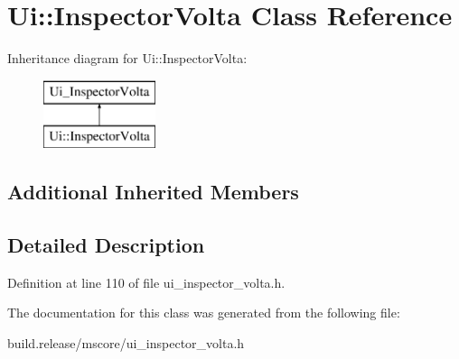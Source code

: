 \hypertarget{class_ui_1_1_inspector_volta}{}\section{Ui\+:\+:Inspector\+Volta Class Reference}
\label{class_ui_1_1_inspector_volta}
Inheritance diagram for Ui\+:\+:Inspector\+Volta\+:\begin{figure}[H]
\begin{center}
\leavevmode
\includegraphics[height=2.000000cm]{class_ui_1_1_inspector_volta}
\end{center}
\end{figure}
\subsection*{Additional Inherited Members}


\subsection{Detailed Description}


Definition at line 110 of file ui\+\_\+inspector\+\_\+volta.\+h.



The documentation for this class was generated from the following file\+:\begin{DoxyCompactItemize}
\item 
build.\+release/mscore/ui\+\_\+inspector\+\_\+volta.\+h\end{DoxyCompactItemize}
